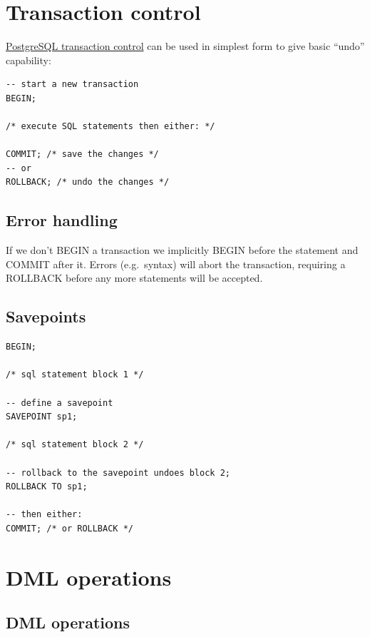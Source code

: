 \documentclass{pgnotes}
\begin{document}
\section{Transaction control}
\label{sec:transaction-control}

\href{https://www.postgresql.org/docs/15/tutorial-transactions.html}{PostgreSQL
transaction control} can be used in simplest form to give basic ``undo''
capability:

\begin{verbatim}
-- start a new transaction
BEGIN;

/* execute SQL statements then either: */

COMMIT; /* save the changes */
-- or
ROLLBACK; /* undo the changes */
\end{verbatim}

\subsection{Error handling}
\label{sec:error-handling}

If we don't BEGIN a transaction we implicitly BEGIN before the statement
and COMMIT after it. Errors (e.g.~syntax) will abort the transaction,
requiring a ROLLBACK before any more statements will be accepted.

\subsection{Savepoints}\label{savepoints}

\begin{verbatim}
BEGIN;

/* sql statement block 1 */

-- define a savepoint
SAVEPOINT sp1;

/* sql statement block 2 */

-- rollback to the savepoint undoes block 2; 
ROLLBACK TO sp1;

-- then either:
COMMIT; /* or ROLLBACK */
\end{verbatim}

\section{DML operations}

\subsection{DML operations}
\end{document}
